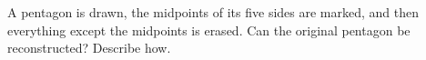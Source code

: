 A pentagon is drawn, the midpoints of its five sides are marked, and then everything except the midpoints is erased. Can the original pentagon be reconstructed? Describe how.
